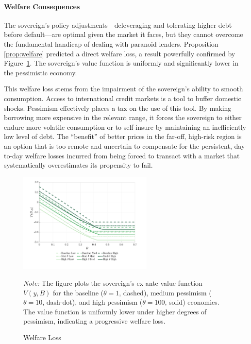 \documentclass[12pt]{article}
\theoremstyle{plain}
\begin{document}
\paragraph{Welfare Consequences}
The sovereign's policy adjustments—deleveraging and tolerating higher debt
before default—are optimal given the market it faces, but they cannot overcome
the fundamental handicap of dealing with paranoid lenders. Proposition
\ref{prop:welfare} predicted a direct welfare loss, a result powerfully
confirmed by Figure~\ref{fig:welfare_loss}. The sovereign's value function is
uniformly and significantly lower in the pessimistic economy.

This welfare loss stems from the impairment of the sovereign's ability to
smooth consumption. Access to international credit markets is a tool to buffer
domestic shocks. Pessimism effectively places a tax on the use of this tool. By
making borrowing more expensive in the relevant range, it forces the sovereign
to either endure more volatile consumption or to self-insure by maintaining an
inefficiently low level of debt. The ``benefit'' of better prices in the
far-off, high-risk region is an option that is too remote and uncertain to
compensate for the persistent, day-to-day welfare losses incurred from being
forced to transact with a market that systematically overestimates its
propensity to fail.

\begin{figure}[h!]
	\centering
	\includegraphics[width=0.6\textwidth]{../../pessimism-default-model/results/comparison_figure_1.pdf}
	\caption{Welfare Loss}
	\label{fig:welfare_loss}
	\parbox{\linewidth}{\small\textit{Note:} The figure plots the sovereign's ex-ante value function $V(y, B)$ for the baseline ($\theta=1$, dashed), medium pessimism ($\theta=10$, dash-dot), and high pessimism ($\theta=100$, solid) economies. The value function is uniformly lower under higher degrees of pessimism, indicating a progressive welfare loss.}
\end{figure}
\end{document}
